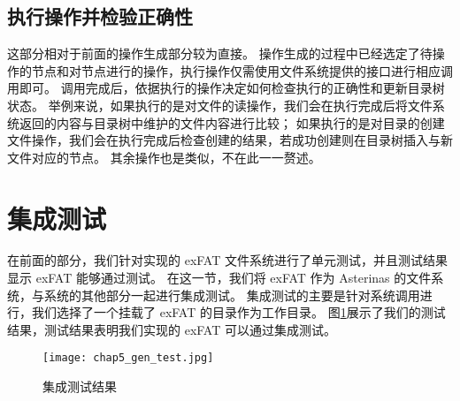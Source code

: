 \subsection{执行操作并检验正确性}
这部分相对于前面的操作生成部分较为直接。
操作生成的过程中已经选定了待操作的节点和对节点进行的操作，执行操作仅需使用文件系统提供的接口进行相应调用即可。
调用完成后，依据执行的操作决定如何检查执行的正确性和更新目录树状态。
举例来说，如果执行的是对文件的读操作，我们会在执行完成后将文件系统返回的内容与目录树中维护的文件内容进行比较；
如果执行的是对目录的创建文件操作，我们会在执行完成后检查创建的结果，若成功创建则在目录树插入与新文件对应的节点。
其余操作也是类似，不在此一一赘述。

\section{集成测试}\label{sec:gen_test}
在前面的部分，我们针对实现的 exFAT 文件系统进行了单元测试，并且测试结果显示 exFAT 能够通过测试。
在这一节，我们将 exFAT 作为 Asterinas 的文件系统，与系统的其他部分一起进行集成测试。
集成测试的主要是针对系统调用进行，我们选择了一个挂载了 exFAT 的目录作为工作目录。
图\ref{fig:gen_test}展示了我们的测试结果，测试结果表明我们实现的 exFAT 可以通过集成测试。

\begin{figure}[h]
    \centering
    \texttt{[image: chap5\_gen\_test.jpg]}
    \caption{集成测试结果}
    \label{fig:gen_test}
\end{figure}

